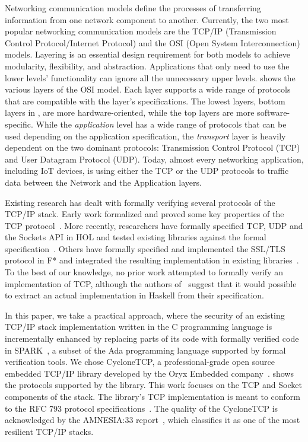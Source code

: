 \documentclass[conference]{IEEEtran}
\begin{document}
Networking communication models define the processes of transferring information from one network component to another. Currently, the two most popular networking communication models are the TCP/IP (Transmission Control Protocol/Internet Protocol) \cite{TCP_IP:ietf_tutorial} and the OSI (Open System Interconnection) \cite{ISO:35.100} models. Layering is an essential design requirement for both models to achieve modularity, flexibility, and abstraction. Applications that only need to use the lower levels' functionality can ignore all the unnecessary upper levels.  shows the various layers of the OSI model. Each layer supports a wide range of protocols that are compatible with the layer's specifications. The lowest layers, bottom layers in , are more hardware-oriented, while the top layers are more software-specific. While the \emph{application} level has a wide range of protocols that can be used depending on the application specification, the \emph{transport} layer is heavily dependent on the two dominant protocols: Transmission Control Protocol (TCP) and User Datagram Protocol (UDP). Today, almost every networking application, including IoT devices, is using either the TCP or the UDP protocols to traffic data between the Network and the Application layers. %



Existing research has dealt with formally verifying several protocols of the TCP/IP stack. Early work formalized and proved some key properties of the TCP protocol~\cite{smith1996formal}. More recently, researchers have formally specified TCP, UDP and the Sockets API in HOL and tested existing libraries against the formal specification~\cite{tcp2005sigcomm,ridge2008rigorous}. Others have formally specified and implemented the SSL/TLS protocol in F* and integrated the resulting implementation in existing libraries~\cite{bhargavan2013implementing}. To the best of our knowledge, no prior work attempted to formally verify an implementation of TCP, although the authors of~\cite{ridge2008rigorous} suggest that it would possible to extract an actual implementation in Haskell from their specification.

In this paper, we take a practical approach, where the security of an existing TCP/IP stack implementation written in the C programming language is incrementally enhanced by replacing parts of its code with formally verified code in SPARK~\cite{mccormick_chapin_2015}, a subset of the Ada programming language supported by formal verification tools. We chose CycloneTCP, a professional-grade open source embedded TCP/IP library developed by the Oryx Embedded company~\cite{CycloneTCP}.  shows the protocols supported by the library. This work focuses on the TCP and Socket components of the stack. The library's TCP implementation is meant to conform to the RFC 793 protocol specifications~\cite{rfc793}. The quality of the CycloneTCP is acknowledged by the AMNESIA:33 report~\cite{AMNESIA33}, which classifies it as one of the most resilient TCP/IP stacks.
\end{document}
